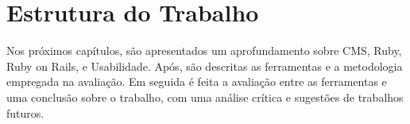 \chapter{Estrutura do Trabalho}

Nos próximos capítulos, são apresentados um aprofundamento sobre CMS, Ruby, Ruby on Rails, e Usabilidade. Após, são descritas as ferramentas e a metodologia empregada na avaliação. Em seguida é feita a avaliação entre as ferramentas e uma conclusão sobre o trabalho, com uma análise crítica e sugestões de trabalhos futuros.



